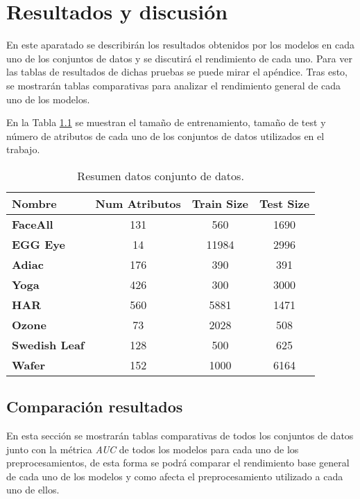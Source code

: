 \chapter{Resultados y discusión}
En este aparatado se describirán los resultados obtenidos por los modelos en cada uno de los conjuntos de datos y se discutirá el rendimiento de cada uno. Para ver las tablas de resultados de dichas pruebas se puede mirar el apéndice. Tras esto, se mostrarán tablas comparativas para analizar el rendimiento general de cada uno de los modelos. \newline

En la Tabla \ref{tab:resumen_datasets} se muestran el tamaño de entrenamiento, tamaño de test y número de atributos de cada uno de los conjuntos de datos utilizados en el trabajo.\newline

\begin{table}[H]
	\centering
	\begin{tabular}{|l|c|c|c|}
		\hline
		\textbf{Nombre}       & \textbf{Num Atributos} & \textbf{Train Size} & \textbf{Test Size} \\
		\hline
		\textbf{FaceAll}      & 131                    & 560                 & 1690               \\
		\textbf{EGG Eye}      & 14                     & 11984               & 2996               \\
		\textbf{Adiac}        & 176                    & 390                 & 391                \\
		\textbf{Yoga}         & 426                    & 300                 & 3000               \\
		\textbf{HAR}          & 560                    & 5881                & 1471               \\
		\textbf{Ozone}        & 73                     & 2028                & 508                \\
		\textbf{Swedish Leaf} & 128                    & 500                 & 625                \\
		\textbf{Wafer}        & 152                    & 1000                & 6164               \\
		\hline
	\end{tabular}
	\caption{Resumen datos conjunto de datos.}
	\label{tab:resumen_datasets}
\end{table}
\newpage
\section{Comparación resultados}
En esta sección se mostrarán tablas comparativas de todos los conjuntos de datos junto con la métrica \textit{AUC} de todos los modelos para cada uno de los preprocesamientos, de esta forma se podrá comparar el rendimiento base general de cada uno de los modelos y como afecta el preprocesamiento utilizado a cada uno de ellos.\newline

